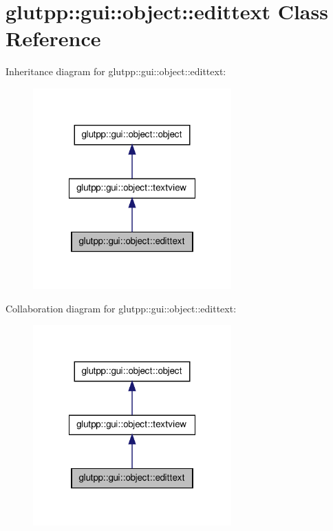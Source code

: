 \hypertarget{classglutpp_1_1gui_1_1object_1_1edittext}{\section{glutpp\-:\-:gui\-:\-:object\-:\-:edittext \-Class \-Reference}
\label{classglutpp_1_1gui_1_1object_1_1edittext}
}


\-Inheritance diagram for glutpp\-:\-:gui\-:\-:object\-:\-:edittext\-:
\nopagebreak
\begin{figure}[H]
\begin{center}
\leavevmode
\includegraphics[width=216pt]{classglutpp_1_1gui_1_1object_1_1edittext__inherit__graph}
\end{center}
\end{figure}


\-Collaboration diagram for glutpp\-:\-:gui\-:\-:object\-:\-:edittext\-:
\nopagebreak
\begin{figure}[H]
\begin{center}
\leavevmode
\includegraphics[width=216pt]{classglutpp_1_1gui_1_1object_1_1edittext__coll__graph}
\end{center}
\end{figure}
